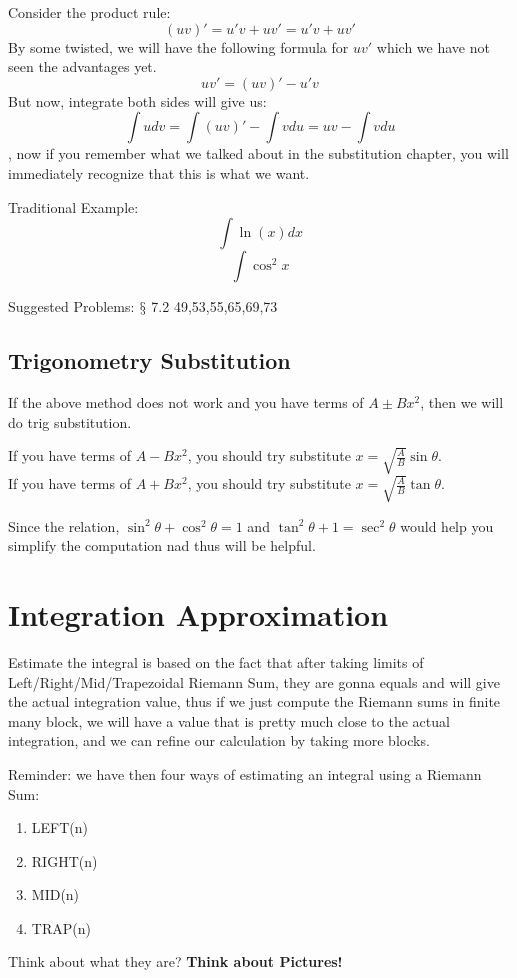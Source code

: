 \documentclass[12pt]{article}
\theoremstyle{definition}
\theoremstyle{definition}
\theoremstyle{remark}
\theoremstyle{definition}
\theoremstyle{definition}
\theoremstyle{definition}
\begin{document}
Consider the product rule:
\[(uv)'=u'v+uv'=u'v+uv' \]
By some twisted, we will have the following formula for $uv'$ which we have not seen the advantages yet.
\[uv'=(uv)'−u'v\]
But now, integrate both sides will give us:
\[\int udv=\int(uv)′−\int vdu= uv - \int v du\], now if you remember what we talked about in the substitution chapter, you will immediately recognize that this is what we want.

Traditional Example:\[\int \ln(x) dx\] \[\int \cos^2 x\]

Suggested Problems: $\mathsection$ 7.2 49,53,55,65,69,73


\subsection{Trigonometry Substitution}

If the above method does not work and you have terms of $A\pm Bx^{2}$, then we will do trig substitution.

If you have terms of $A-Bx^{2}$, you should try substitute $x=\sqrt{\frac{A}{B}}\sin \theta$.\\
If you have terms of $A+Bx^{2}$, you should try substitute $x=\sqrt{\frac{A}{B}}\tan \theta$.

Since the relation, $\sin^{2}\theta+\cos^{2}\theta=1$ and $\tan^{2}\theta+1=\sec^{2}\theta$ would help you simplify the computation nad thus will be helpful.



\section{Integration Approximation}

Estimate the integral is based on the fact that after taking limits of Left/Right/Mid/Trapezoidal Riemann Sum, they are gonna equals and will give the actual integration value, thus if we just compute the Riemann sums in finite many block, we will have a value that is pretty much close to the actual integration, and we can refine our calculation by taking more blocks.

Reminder: we have then four ways of estimating an integral using a Riemann Sum:
\begin{enumerate}
\item LEFT(n)
\item RIGHT(n)
\item MID(n)
\item TRAP(n)
\end{enumerate}
Think about what they are?
\textbf{Think about Pictures!}
\end{document}

